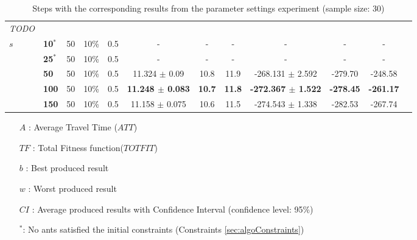 \begin{sidewaystable}
\begin{tabular}{|l|l|l|l|l||c|c|c|c|c|c|c|}
    \hline
    \emph{\color{blue}TODO} & & & & & &  &  & &  &   \\
    $s$ & \textbf{10$^*$} & 50 & 10\% & 0.5  & - & - & - & - & -& - \\
    ~ & \textbf{25$^*$} & 50 & 10\% & 0.5  & - & - & - & - & - & -  \\
    ~ & \textbf{50} & 50 & 10\% & 0.5  & 11.324 $\pm$ 0.09 & 10.8 & 11.9 & -268.131 $\pm$ 2.592 & -279.70 & -248.58\\
    ~ & \textbf{100} & 50 & 10\% & 0.5 & \textbf{11.248 $\pm$ 0.083} & \textbf{10.7} & \textbf{11.8} & \textbf{-272.367 $\pm$ 1.522} & \textbf{-278.45} & \textbf{-261.17}\\
    ~ & \textbf{150} & 50 & 10\% & 0.5  & 11.158 $\pm$ 0.075 & 10.6 & 11.5 & -274.543 $\pm$ 1.338 & -282.53 & -267.74\\
    \hline
    \end{tabular}
    \caption {Steps with the corresponding results from the parameter settings experiment (sample size: 30)}
    \tiny
    \begin{itemize}[noitemsep]
    \item[$A$ :] Average Travel Time ($ATT$)
    \item[$TF$ :] Total Fitness function($TOTFIT$)
    \item[$b$ :] Best produced result
    \item[$w$ :] Worst produced result
    \item[$CI$ :] Average produced results with Confidence Interval (confidence level: 95\%)
    \item[$^*$:] No ants satisfied the initial constraints (Constraints \vref{sec:algoConstraints})
    \end{itemize}
    \label{table:pm1}
\end{sidewaystable}

